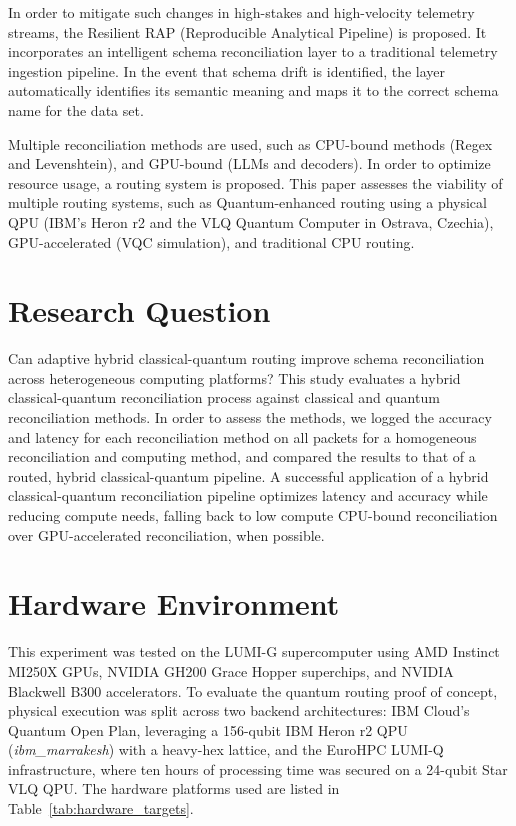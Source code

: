 \documentclass[journal]{IEEEtran}
\begin{document}
In order to mitigate such changes in high-stakes and high-velocity telemetry streams, the Resilient RAP (Reproducible Analytical Pipeline) is proposed. It incorporates an intelligent schema reconciliation layer to a traditional telemetry ingestion pipeline. In the event that schema drift is identified, the layer automatically identifies its semantic meaning and maps it to the correct schema name for the data set. 

Multiple reconciliation methods are used, such as CPU-bound methods (Regex and Levenshtein), and GPU-bound (LLMs and decoders). In order to optimize resource usage, a routing system is proposed. This paper assesses the viability of multiple routing systems, such as Quantum-enhanced routing using a physical QPU (IBM's Heron r2 and the VLQ Quantum Computer in Ostrava, Czechia), GPU-accelerated (VQC simulation), and traditional CPU routing.

\section{Research Question}
Can adaptive hybrid classical-quantum routing improve schema reconciliation across heterogeneous computing platforms? This study evaluates a hybrid classical-quantum reconciliation process against classical and quantum reconciliation methods. In order to assess the methods, we logged the accuracy and latency for each reconciliation method on all packets for a homogeneous reconciliation and computing method, and compared the results to that of a routed, hybrid classical-quantum pipeline. A successful application of a hybrid classical-quantum reconciliation pipeline optimizes latency and accuracy while reducing compute needs, falling back to low compute CPU-bound reconciliation over GPU-accelerated reconciliation, when possible.

\section{Hardware Environment}
This experiment was tested on the LUMI-G supercomputer using AMD Instinct MI250X GPUs, NVIDIA GH200 Grace Hopper superchips, and NVIDIA Blackwell B300 accelerators. To evaluate the quantum routing proof of concept, physical execution was split across two backend architectures: IBM Cloud's Quantum Open Plan, leveraging a 156-qubit IBM Heron r2 QPU (\textit{ibm\_marrakesh}) with a heavy-hex lattice, and the EuroHPC LUMI-Q infrastructure, where ten hours of processing time was secured on a 24-qubit Star VLQ QPU.
The hardware platforms used are listed in Table~\ref{tab:hardware_targets}.
\end{document}
